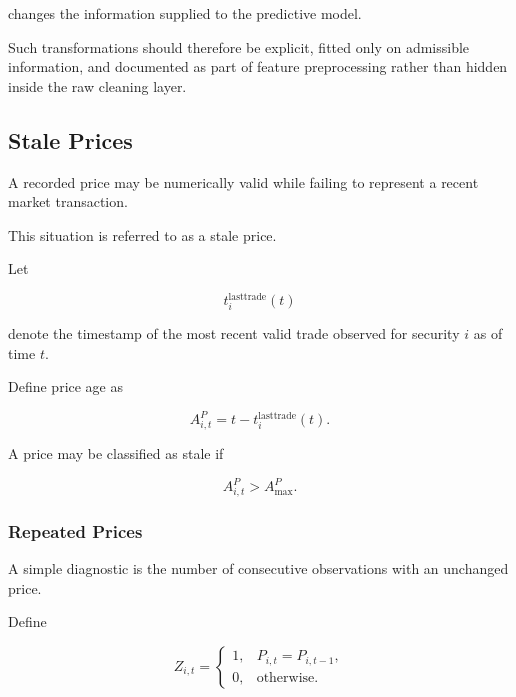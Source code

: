 \documentclass[11pt,a4paper]{article}
\begin{document}
changes the information supplied to the predictive model.

Such transformations should therefore be explicit, fitted only on admissible
information, and documented as part of feature preprocessing rather than hidden
inside the raw cleaning layer.


\subsection{Stale Prices}
\label{subsec:stale_prices}

A recorded price may be numerically valid while failing to represent a recent
market transaction.

This situation is referred to as a stale price.

Let

\begin{equation}
t_{i}^{\mathrm{lasttrade}}(t)
\end{equation}

denote the timestamp of the most recent valid trade observed for security $i$
as of time $t$.

Define price age as

\begin{equation}
\boxed{
A_{i,t}^{P}
=
t
-
t_{i}^{\mathrm{lasttrade}}(t).
}
\end{equation}

A price may be classified as stale if

\begin{equation}
A_{i,t}^{P}
>
A_{\max}^{P}.
\end{equation}


\subsubsection{Repeated Prices}

A simple diagnostic is the number of consecutive observations with an
unchanged price.

Define

\begin{equation}
Z_{i,t}
=
\begin{cases}
1,
&
P_{i,t}=P_{i,t-1},
\\
0,
&
\text{otherwise}.
\end{cases}
\end{equation}
\end{document}
